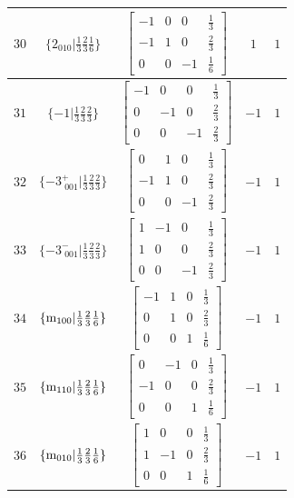 \documentclass[fleqn,8pt]{jsarticle}
\begin{document}
\begin{longtable}{ccccc}
$ 30 $ & $ \{2{}_{010}|\frac{1}{3} \frac{2}{3} \frac{1}{6}\} $ & $ \begin{bmatrix} -1 & 0 & 0 & \frac{1}{3} \\ -1 & 1 & 0 & \frac{2}{3} \\ 0 & 0 & -1 & \frac{1}{6} \end{bmatrix} $ & $ 1 $ & $ 1 $ \\ \hline
$ 31 $ & $ \{-1|\frac{1}{3} \frac{2}{3} \frac{2}{3}\} $ & $ \begin{bmatrix} -1 & 0 & 0 & \frac{1}{3} \\ 0 & -1 & 0 & \frac{2}{3} \\ 0 & 0 & -1 & \frac{2}{3} \end{bmatrix} $ & $ -1 $ & $ 1 $ \\ \hline
$ 32 $ & $ \{-3^{+}_{\,\,001}|\frac{1}{3} \frac{2}{3} \frac{2}{3}\} $ & $ \begin{bmatrix} 0 & 1 & 0 & \frac{1}{3} \\ -1 & 1 & 0 & \frac{2}{3} \\ 0 & 0 & -1 & \frac{2}{3} \end{bmatrix} $ & $ -1 $ & $ 1 $ \\ \hline
$ 33 $ & $ \{-3^{-}_{\,\,001}|\frac{1}{3} \frac{2}{3} \frac{2}{3}\} $ & $ \begin{bmatrix} 1 & -1 & 0 & \frac{1}{3} \\ 1 & 0 & 0 & \frac{2}{3} \\ 0 & 0 & -1 & \frac{2}{3} \end{bmatrix} $ & $ -1 $ & $ 1 $ \\ \hline
$ 34 $ & $ \{{\rm m}_{100}|\frac{1}{3} \frac{2}{3} \frac{1}{6}\} $ & $ \begin{bmatrix} -1 & 1 & 0 & \frac{1}{3} \\ 0 & 1 & 0 & \frac{2}{3} \\ 0 & 0 & 1 & \frac{1}{6} \end{bmatrix} $ & $ -1 $ & $ 1 $ \\ \hline
$ 35 $ & $ \{{\rm m}_{110}|\frac{1}{3} \frac{2}{3} \frac{1}{6}\} $ & $ \begin{bmatrix} 0 & -1 & 0 & \frac{1}{3} \\ -1 & 0 & 0 & \frac{2}{3} \\ 0 & 0 & 1 & \frac{1}{6} \end{bmatrix} $ & $ -1 $ & $ 1 $ \\ \hline
$ 36 $ & $ \{{\rm m}_{010}|\frac{1}{3} \frac{2}{3} \frac{1}{6}\} $ & $ \begin{bmatrix} 1 & 0 & 0 & \frac{1}{3} \\ 1 & -1 & 0 & \frac{2}{3} \\ 0 & 0 & 1 & \frac{1}{6} \end{bmatrix} $ & $ -1 $ & $ 1 $ \\ \hline

\end{longtable}
\end{document}
